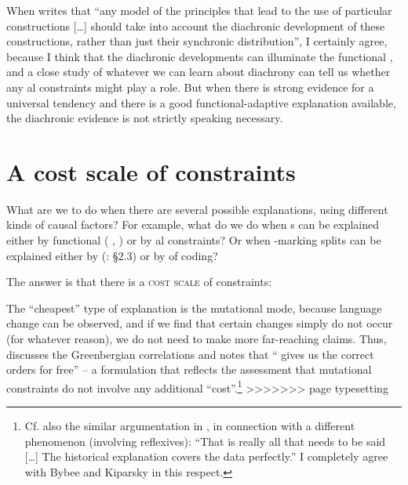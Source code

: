 \documentclass[output=paper]{langsci/langscibook}
\begin{document}
When \citet[297]{Cristofaro2014} writes that “any model of the principles that lead to the use of particular constructions […] should take into account the diachronic development of these constructions, rather than just their synchronic distribution”, I certainly agree, because I think that the diachronic developments can illuminate the functional , and a close study of whatever we can learn about diachrony can tell us whether any al constraints might play a role. But when there is strong evidence for a universal tendency and there is a good functional-adaptive explanation available, the diachronic evidence is not strictly speaking necessary.\label{p:haspelmath:strictlyspeakingnecessary}

\section{A cost scale of constraints}\label{sec:haspelmath:7}

What are we to do when there are several possible explanations, using different kinds of causal factors? For example, what do we do when s can be explained either by functional  ( , \citealt{Hawkins2014_VarEff}) or by al constraints? Or when -marking splits can be explained either by  (\citealt{Kiparsky2008}: §2.3) or by  of coding?

  The answer is that there is a \textsc{cost scale} of constraints:


The “cheapest” type of explanation is the mutational mode, because language change can be observed, and if we find that certain changes simply do not occur (for whatever reason), we do not need to make more far-reaching claims. Thus, \citet[111]{Bybee2010} discusses the Greenbergian  correlations and notes that “ gives us the correct orders for free” – a formulation that reflects the assessment that mutational constraints do not involve any additional “cost”.\footnote{Cf. also the similar argumentation in \citet[33]{Kiparsky2008}, in connection with a different phenomenon (involving reflexives): “That is really all that needs to be said […] The historical explanation covers the data perfectly.” I completely agree with Bybee and Kiparsky in this respect.}
>>>>>>> page typesetting
\end{document}
